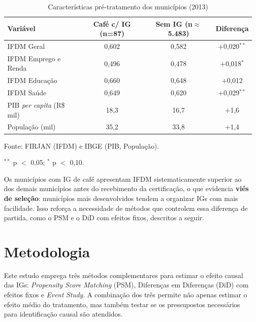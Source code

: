 \documentclass[12pt, a4paper]{article}
\begin{document}
\begin{table}[htbp]
\centering
\caption{Características pré-tratamento dos municípios (2013)}
\label{tab:descritivas}
\begin{threeparttable}
\begin{tabular}{lccc}
\toprule
Variável & Café c/ IG (n=87) & Sem IG (n$\approx$5.483) & Diferença \\
\midrule
IFDM Geral                        & 0,602 & 0,582 & $+$0,020$^{**}$ \\
IFDM Emprego e Renda              & 0,496 & 0,478 & $+$0,018$^{*}$  \\
IFDM Educação                     & 0,660 & 0,648 & $+$0,012        \\
IFDM Saúde                        & 0,649 & 0,620 & $+$0,029$^{**}$ \\
PIB \textit{per capita} (R\$ mil) & 18,3  & 16,7  & $+$1,6          \\
População (mil)                   & 35,2  & 33,8  & $+$1,4          \\
\bottomrule
\end{tabular}
\begin{tablenotes}
\small
\item Fonte: FIRJAN (IFDM) e IBGE (PIB, População).
\item $^{**}$ p $<$ 0,05;\; $^{*}$ p $<$ 0,10.
\end{tablenotes}
\end{threeparttable}
\end{table}

Os municípios com IG de café apresentam IFDM sistematicamente superior ao dos demais municípios antes do recebimento da certificação, o que evidencia \textbf{viés de seleção}: municípios mais desenvolvidos tendem a organizar IGs com mais facilidade. Isso reforça a necessidade de métodos que controlem essa diferença de partida, como o PSM e o DiD com efeitos fixos, descritos a seguir.

\section{Metodologia}

Este estudo emprega três métodos complementares para estimar o efeito causal das IGs: \textit{Propensity Score Matching} (PSM), Diferenças em Diferenças (DiD) com efeitos fixos e \textit{Event Study}. A combinação dos três permite não apenas estimar o efeito médio do tratamento, mas também testar se os pressupostos necessários para identificação causal são atendidos.
\end{document}
